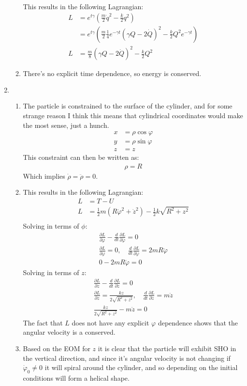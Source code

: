 \documentclass[12pt]{article}
\newcommand{\p}[2]{\frac{\partial #1}{\partial #2}}
\newcommand{\der}[2]{\frac{d #1}{d #2}}
\newcommand{\Lag}[3]{
  \p{L}{#1}-\der{}{t}\p{L}{\dot{#1}}=0\\
  \p{L}{#1}=#2,\quad \der{}{t}\p{L}{\dot{#1}}=#3\\
  #2-#3=0
}
\begin{document}
\begin{enumerate}
\begin{enumerate}
      This results in the following Lagrangian:
      \begin{align*}
        L&=e^{t\gamma}\left( \frac{m}{2}\dot{q}^2-\frac{k}{2}q^2 \right)\\
        &=e^{t\gamma}\left( \frac{m}{2}\frac{1}{4}e^{-\gamma t}\left( \gamma Q-2\dot{Q} \right)^2-\frac{k}{2}Q^2 e^{-\gamma t} \right)\\
        L&=\frac{m}{8}\left( \gamma Q-2\dot{Q} \right)^2-\frac{k}{2}Q^2
      \end{align*}
      \item There's no explicit time dependence, so energy is conserved.
    \end{enumerate}
    \item
    \begin{enumerate}
      \item The particle is constrained to the surface of the cylinder, and for some strange reason I think this means that cylindrical coordinates would make the most sense, just a hunch.
      \begin{align*}
        x&=\rho\cos\varphi\\
        y&=\rho\sin\varphi\\
        z&=z
      \end{align*}
      This constraint can then be written as:
      \begin{gather*}
        \rho=R
      \end{gather*}
      Which implies $\dot{\rho}=\ddot{\rho}=0$.
      \item This results in the following Lagrangian:
      \begin{align*}
        L&=T-U\\
        L&=\frac{1}{2}m\left(R\dot{\varphi}^2+\dot{z}^2\right)-\frac{1}{2}k\sqrt{R^2+z^2}\\
      \end{align*}
      Solving in terms of $\phi$:
      \begin{gather*}
        \Lag{\varphi}{0}{2mR\ddot{\varphi}}
      \end{gather*}
      Solving in terms of $z$:
      \begin{gather*}
        \Lag{z}{\frac{kz}{2\sqrt{R^2+z^2}}}{m\ddot{z}}
      \end{gather*}
      The fact that $L$ does not have any explicit $\varphi$ dependence shows that the angular velocity is a conserved.
      \item Based on the EOM for $z$ it is clear that the particle will exhibit SHO in the vertical direction, and since it's angular velocity is not changing if $\dot{\varphi}_0\neq0$ it will spiral around the cylinder, and so depending on the initial conditions will form a helical shape.
    \end{enumerate}
  \end{enumerate}
\end{document}
